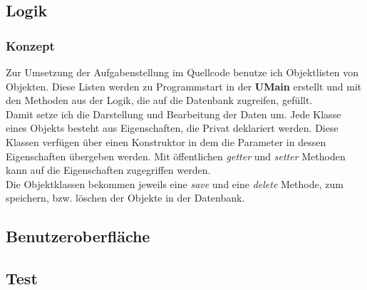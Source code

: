 \subsection{Logik}
\subsubsection{Konzept}
Zur Umsetzung der Aufgabenstellung im Quellcode benutze ich Objektlisten von Objekten.
Diese Listen werden zu Programmstart in der \textbf{UMain} erstellt und mit den Methoden aus der Logik, die auf die Datenbank zugreifen, gefüllt.\\
Damit setze ich die Darstellung und Bearbeitung der Daten um. Jede Klasse eines Objekts besteht aus Eigenschaften, die Privat deklariert werden. Diese Klassen verfügen über einen Konstruktor in dem die Parameter in dessen Eigenschaften übergeben werden. Mit öffentlichen \textit{getter} und \textit{setter} Methoden kann auf die Eigenschaften zugegriffen werden.\\
Die Objektklassen bekommen jeweils eine \textit{save} und eine \textit{delete} Methode, zum speichern, bzw. löschen der Objekte in der Datenbank.


\subsection{Benutzeroberfläche}
\subsection{Test}

